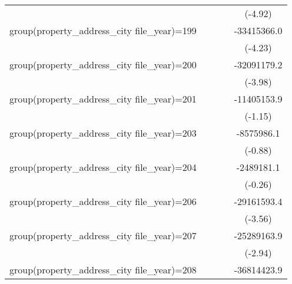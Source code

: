 {\begin{tabular}{l*{4}{c}}
                    &                     &                     &                     &     (-4.92)         \\
\addlinespace
group(property\_address\_city file\_year)=199&                     &                     &                     & -33415366.0\sym{***}\\
                    &                     &                     &                     &     (-4.23)         \\
\addlinespace
group(property\_address\_city file\_year)=200&                     &                     &                     & -32091179.2\sym{***}\\
                    &                     &                     &                     &     (-3.98)         \\
\addlinespace
group(property\_address\_city file\_year)=201&                     &                     &                     & -11405153.9         \\
                    &                     &                     &                     &     (-1.15)         \\
\addlinespace
group(property\_address\_city file\_year)=203&                     &                     &                     &  -8575986.1         \\
                    &                     &                     &                     &     (-0.88)         \\
\addlinespace
group(property\_address\_city file\_year)=204&                     &                     &                     &  -2489181.1         \\
                    &                     &                     &                     &     (-0.26)         \\
\addlinespace
group(property\_address\_city file\_year)=206&                     &                     &                     & -29161593.4\sym{***}\\
                    &                     &                     &                     &     (-3.56)         \\
\addlinespace
group(property\_address\_city file\_year)=207&                     &                     &                     & -25289163.9\sym{**} \\
                    &                     &                     &                     &     (-2.94)         \\
\addlinespace
group(property\_address\_city file\_year)=208&                     &                     &                     & -36814423.9\sym{***}\\

\end{tabular}}
